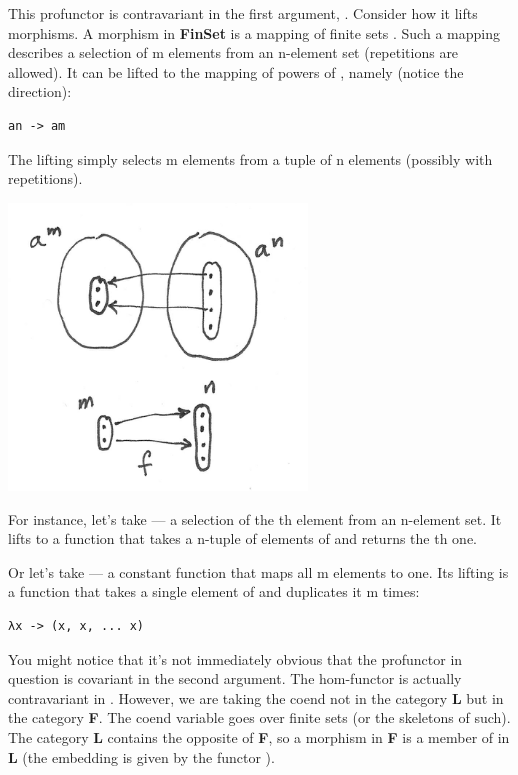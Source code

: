 This profunctor is contravariant in the first argument, .
Consider how it lifts morphisms. A morphism in \textbf{FinSet} is a
mapping of finite sets . Such a
mapping describes a selection of m elements from an n-element set
(repetitions are allowed). It can be lifted to the mapping of powers of
, namely (notice the direction):

\begin{Verbatim}[commandchars=\\\{\}]
an -> am
\end{Verbatim}

The lifting simply selects m elements from a tuple of n elements
 (possibly with repetitions).

\includegraphics[width=3.12500in]{images/liftpower.png}

For instance, let's take  --- a
selection of the th element from an n-element set. It lifts to
a function that takes a n-tuple of elements of  and returns
the th one.

Or let's take  --- a constant
function that maps all m elements to one. Its lifting is a function that
takes a single element of  and duplicates it m times:

\begin{Verbatim}[commandchars=\\\{\}]
λx -> (x, x, ... x)
\end{Verbatim}

You might notice that it's not immediately obvious that the profunctor
in question is covariant in the second argument. The hom-functor
 is actually contravariant in . However, we
are taking the coend not in the category \textbf{L} but in the category
\textbf{F}. The coend variable  goes over finite sets (or the
skeletons of such). The category \textbf{L} contains the opposite of
\textbf{F}, so a morphism  in \textbf{F}
is a member of  in \textbf{L} (the embedding is given
by the functor ).


